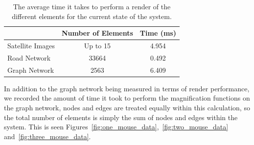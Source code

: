 \begin{table}[htp]
    \begin{center}
        \caption[Road and Graph Network Average Render Time]{The average time it takes to perform a render of the different elements for the current state of the system.}
        \label{table:road_and_graph_render_time}
        \begin{tabular}[H]{l | c | c}
                                & Number of Elements    & Time (ms)   \\
            \hline
            Satellite Images    & Up to 15              & 4.954 \\
            Road Network        & 33664                 & 0.492 \\
            Graph Network       & 2563                  & 6.409 \\
        \end{tabular}
    \end{center}
\end{table}

In addition to the graph network being measured in terms of render performance, we recorded the amount of time it took to perform the magnification functions on the graph network, nodes and edges are treated equally within this calculation, so the total number of elements is simply the sum of nodes and edges within the system. This is seen Figures~\ref{fig:one_mouse_data},~\ref{fig:two_mouse_data} and~\ref{fig:three_mouse_data}.

